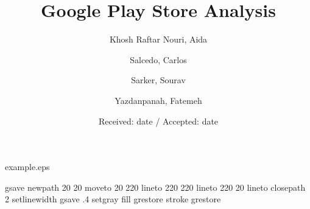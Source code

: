 
\begin{filecontents*}{example.eps}

gsave
newpath
  20 20 moveto
  20 220 lineto
  220 220 lineto
  220 20 lineto
closepath
2 setlinewidth
gsave
  .4 setgray fill
grestore
stroke
grestore
\end{filecontents*}
%
\RequirePackage{fix-cm}
%
\documentclass[smallextended]{svjour3}       %
%
\smartqed  %
%
\usepackage{graphicx}
\usepackage{cite}
\usepackage[a4paper]{geometry}



\title{Google Play Store Analysis}%



\author{Khosh Raftar Nouri, Aida        \and
        Salcedo, Carlos \and
Sarker, Sourav \and
Yazdanpanah, Fatemeh} %



\date{Received: date / Accepted: date}


\maketitle


\section*{Introduction to data}

